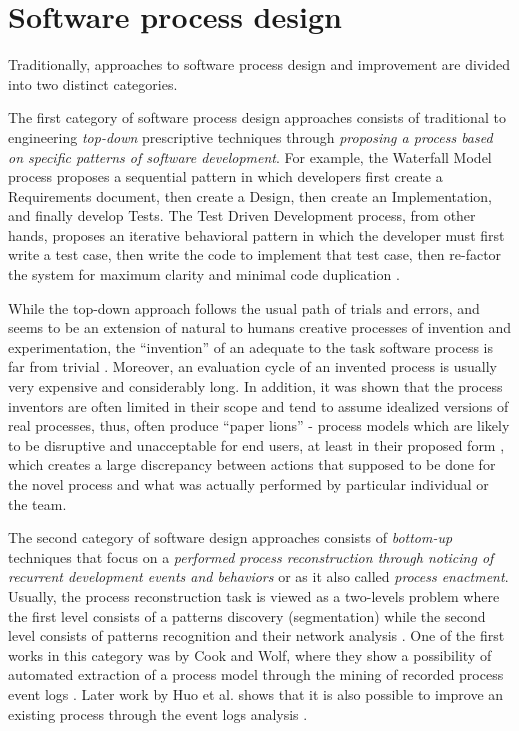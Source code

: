 \section{Software process design}\label{section_software_process_design}
Traditionally, approaches to software process design and improvement are divided into two distinct categories. 

The first category of software process design approaches consists of traditional to engineering 
\textit{top-down} prescriptive techniques through 
\textit{proposing a process based on specific patterns of software development}. 
For example, the Waterfall Model process proposes a sequential pattern in which developers first create a 
Requirements document, then create a Design, then create an Implementation, and finally develop Tests. 
The Test Driven Development process, from other hands, proposes an iterative behavioral pattern in which
the developer must first write a test case, then write the code to implement that test case, then re-factor the 
system for maximum clarity and minimal code duplication \cite{citeulike:6086365}. 

While the top-down approach follows the usual path of trials and errors, and seems to be an extension 
of natural to humans creative processes of invention and experimentation, 
the ``invention'' of an adequate to the task software process is far from trivial 
\cite{citeulike:5043104} \cite{citeulike:1986013}. Moreover, an evaluation cycle of an invented process
is usually very expensive and considerably long.
In addition, it was shown that the process inventors are often limited in their scope and tend to assume 
idealized versions of real processes, thus, often produce ``paper lions'' - process models which are 
likely to be disruptive and unacceptable for end users, at least in their proposed form 
\cite{citeulike:9758924}, which creates a large discrepancy between actions that supposed to be done for 
the novel process and what was actually performed by particular individual or the team.

The second category of software design approaches consists of \textit{bottom-up} techniques 
that focus on a \textit{performed process reconstruction through noticing of recurrent development 
events and behaviors} or as it also called \textit{process enactment}. 
Usually, the process reconstruction task is viewed as a two-levels problem where the first level 
consists of a patterns discovery (segmentation) while the second level consists of patterns recognition 
and their network analysis \cite{citeulike:2703162}.
One of the first works in this category was by Cook and Wolf, where they show a
possibility of automated extraction of a process model through the mining of recorded 
process event logs \cite{citeulike:328044} \cite{citeulike:5120757} \cite{citeulike:5128143}. 
Later work by Huo et al. shows that it is also possible to improve an existing process
through the event logs analysis \cite{citeulike:7691059} \cite{citeulike:7690766}. 

